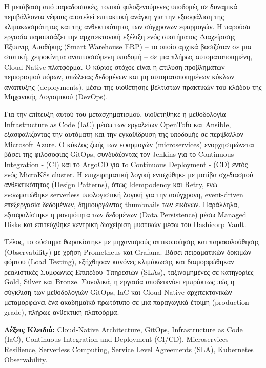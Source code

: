 Η μετάβαση από παραδοσιακές, τοπικά φιλοξενούμενες υποδομές σε δυναμικά περιβάλλοντα νέφους αποτελεί επιτακτική ανάγκη για την εξασφάλιση της κλιμακωσιμότητας και της ανθεκτικότητας των σύγχρονων εφαρμογών. Η παρούσα εργασία παρουσιάζει την αρχιτεκτονική εξέλιξη ενός συστήματος Διαχείρισης Έξυπνης Αποθήκης (Smart Warehouse ERP) – το οποίο αρχικά βασιζόταν σε μια στατική, χειροκίνητα αναπτυσσόμενη υποδομή – σε μια πλήρως αυτοματοποιημένη, Cloud-Native πλατφόρμα. Ο κύριος στόχος είναι η επίλυση προβλημάτων περιορισμού πόρων, απώλειας δεδομένων και μη αυτοματοποιημένων κύκλων ανάπτυξης (deployments), μέσω της υιοθέτησης βέλτιστων πρακτικών του κλάδου της Μηχανικής Λογισμικού (DevOps).

Για την επίτευξη αυτού του μετασχηματισμού, υιοθετήθηκε η μεθοδολογία Infrastructure as Code (IaC) μέσω των εργαλείων OpenTofu και Ansible, εξασφαλίζοντας την αυτόματη και την εγκαθίδρυση της υποδομής σε περιβάλλον Microsoft Azure. Ο κύκλος ζωής των εφαρμογών (microservices) ενορχηστρώνεται βάσει της φιλοσοφίας GitOps, συνδυάζοντας τον Jenkins για το Continuous Integration - (CI) και το ArgoCD για τo Continuous Deployment - (CD) εντός ενός MicroK8s cluster. Η επιχειρηματική λογική ενισχύθηκε με μοτίβα σχεδιασμού ανθεκτικότητας (Design Patterns), όπως Idempodency και Retry, ενώ ενσωματώθηκε serverless υπολογιστική λογική για την ασύγχρονη, event-driven επεξεργασία δεδομένων, δημιουργώντας thumbnails των εικόνων. Παράλληλα, εξασφαλίστηκε η μονιμότητα των δεδομένων (Data Persistence) μέσω Managed Disks και επιτεύχθηκε κεντρική διαχείριση μυστικών μέσω του Hashicorp Vault.

Τέλος, το σύστημα θωρακίστηκε με μηχανισμούς οπτικοποίησης και παρακολούθησης (Observability) με χρήση Prometheus και Grafana. Βάσει πειραματικών δοκιμών φόρτου (Load Testing), εξήχθησαν κανόνες κλιμάκωσης και διαμορφώθηκαν ρεαλιστικές Συμφωνίες Επιπέδου Υπηρεσιών (SLAs), ταξινομημένες σε κατηγορίες Gold, Silver και Bronze. Συνολικά, η εργασία αποδεικνύει εμπράκτως πώς η σύγκλιση των μεθοδολογιών GitOps, IaC και Cloud-Native αρχιτεκτονικών μεταμορφώνει ένα ακαδημαϊκό πρωτότυπο σε μια παραγωγικά έτοιμη (production-grade), πλήρως ανθεκτική πλατφόρμα. \newline \newline

\noindent \textbf{Λέξεις Κλειδιά:} Cloud-Native Architecture, GitOps, Infrastructure as Code (IaC), Continuous Integration and Deployment (CI/CD), Microservices Resilience, Serverless Computing, Service Level Agreements (SLA), Kubernetes Observability.